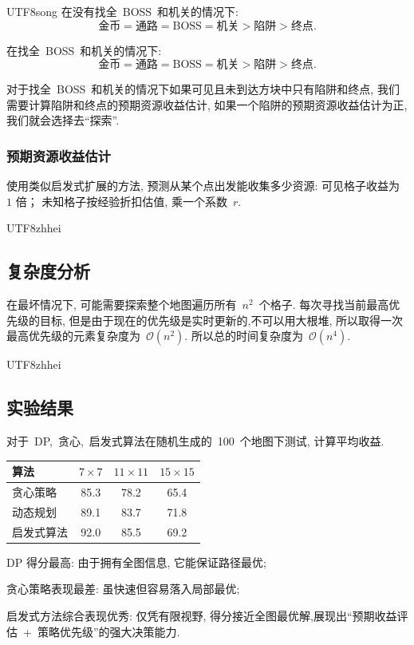 \documentclass[10.5pt,compsoc]{CjC}
\theoremstyle{mystyle}
\begin{document}
\begin{CJK*}{UTF8}{song}
在没有找全~BOSS~和机关的情况下:
$$
\textrm{金币}=\textrm{通路}=\textrm{BOSS}=\textrm{机关}>\textrm{陷阱}>\textrm{终点}.
$$

在找全~BOSS~和机关的情况下:
$$
\textrm{金币}=\textrm{通路}=\textrm{BOSS}=\textrm{机关}>\textrm{陷阱}>\textrm{终点}.
$$

对于找全~BOSS~和机关的情况下如果可见且未到达方块中只有陷阱和终点,
我们需要计算陷阱和终点的预期资源收益估计, 如果一个陷阱的预期资源收益估计为正,
我们就会选择去“探索”.

\subsubsection{预期资源收益估计}

使用类似启发式扩展的方法, 预测从某个点出发能收集多少资源:
可见格子收益为 $1$ 倍；
未知格子按经验折扣估值, 乘一个系数~$r$.

\begin{CJK*}{UTF8}{zhhei}\subsection{复杂度分析}\end{CJK*}

在最坏情况下, 可能需要探索整个地图遍历所有~$n^2$~个格子.
每次寻找当前最高优先级的目标, 但是由于现在的优先级是实时更新的,不可以用大根堆,
所以取得一次最高优先级的元素复杂度为~$\mathcal{O}(n^2)$.
所以总的时间复杂度为~$\mathcal{O}(n^4)$.
    
\begin{CJK*}{UTF8}{zhhei}\subsection{实验结果}\end{CJK*}

对于~DP,~贪心,~启发式算法在随机生成的~100~个地图下测试, 计算平均收益.
\vskip 30mm

\begin{table}[htbp]
\vspace{-2.5mm}
\begin{center}
\begin{tabular}{lccc}
\toprule
算法 & $7\times7$ & $11 \times 11$ & $15 \times 15$ \\  %
\hline
贪心策略 & 85.3 & 78.2 & 65.4 \\
动态规划 & 89.1 & 83.7 & 71.8 \\
启发式算法 & 92.0 & 85.5 & 69.2 \\
\bottomrule
\end{tabular}
\label{tab1}
\end{center}
\end{table}
DP 得分最高: 由于拥有全图信息, 它能保证路径最优;

贪心策略表现最差: 虽快速但容易落入局部最优;

启发式方法综合表现优秀: 仅凭有限视野,
得分接近全图最优解,展现出“预期收益评估~+~策略优先级”的强大决策能力.

\end{CJK*}
\end{document}
